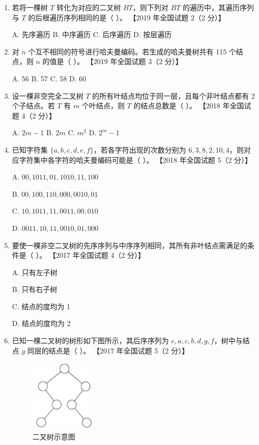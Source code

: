 \documentclass[lang=cn,newtx,10pt,scheme=chinese]{../../elegantbook}
\begin{document}
\begin{enumerate}
    \item 若将一棵树 $T$ 转化为对应的二叉树 $BT$，则下列对 $BT$ 的遍历中，其遍历序列与 $T$ 的后根遍历序列相同的是（ ）。  
    【2019 年全国试题 2（2 分）】  

    A. 先序遍历 \quad B. 中序遍历 \quad C. 后序遍历 \quad D. 按层遍历  

    \item 对 $n$ 个互不相同的符号进行哈夫曼编码。若生成的哈夫曼树共有 115 个结点，则 $n$ 的值是（ ）。  
    【2019 年全国试题 3（2 分）】  

    A. 56 \quad B. 57 \quad C. 58 \quad D. 60  

    \item 设一棵非空完全二叉树 $T$ 的所有叶结点均位于同一层，且每个非叶结点都有 2 个子结点。若 $T$ 有 $m$ 个叶结点，则 $T$ 的结点总数是（ ）。  
    【2018 年全国试题 4（2 分）】

    A. $2m - 1$ \quad B. $2m$ \quad C. $m^2$ \quad D. $2^{m} - 1$  

    \item 已知字符集 $\{a, b, c, d, e, f\}$，若各字符出现的次数分别为 $6, 3, 8, 2, 10, 4$，则对应字符集中各字符的哈夫曼编码可能是（ ）。  
    【2018 年全国试题 5（2 分）】  

    A. $00, 1011, 01, 1010, 11, 100$  

    B. $00, 100, 110, 000, 0010, 01$  

    C. $10, 1011, 11, 0011, 00, 010$  

    D. $0011, 10, 11, 0010, 01, 000$  

    \item 要使一棵非空二叉树的先序序列与中序序列相同，其所有非叶结点需满足的条件是（ ）。  
    【2017 年全国试题 4（2 分）】  



    A. 只有左子树  

    B. 只有右子树  




    C. 结点的度均为 1  

    D. 结点的度均为 2  

    \item 已知一棵二叉树的树形如下图所示，其后序序列为 $e, a, c, b, d, g, f$，树中与结点 $g$ 同层的结点是（ ）。  
    【2017 年全国试题 5（2 分）】  

    \begin{figure}[h!]
            \centering
            \includegraphics[width=0.3\textwidth]{../../figure/exercisePicPDF/chapter6/6-6.pdf}
            \caption{二叉树示意图}
    \end{figure}


\end{enumerate}
\end{document}
